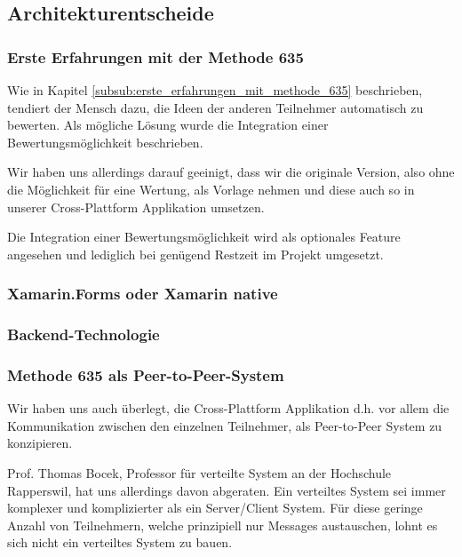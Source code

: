 \subsection{Architekturentscheide}

\subsubsection{Erste Erfahrungen mit der Methode 635}
Wie in Kapitel \ref{subsub:erste_erfahrungen_mit_methode_635} beschrieben, tendiert der Mensch dazu, die Ideen der anderen Teilnehmer automatisch zu bewerten. Als mögliche Lösung wurde die Integration einer Bewertungsmöglichkeit beschrieben.


Wir haben uns allerdings darauf geeinigt, dass wir die originale Version, also ohne die Möglichkeit für eine Wertung, als Vorlage nehmen und diese auch so in unserer Cross-Plattform Applikation umsetzen. 


Die Integration einer Bewertungsmöglichkeit wird als optionales Feature angesehen und lediglich bei genügend Restzeit im Projekt umgesetzt.

\subsubsection{Xamarin.Forms oder Xamarin native}

\subsubsection{Backend-Technologie}

\subsubsection{Methode 635 als Peer-to-Peer-System}
Wir haben uns auch überlegt, die Cross-Plattform Applikation d.h. vor allem die Kommunikation zwischen den einzelnen Teilnehmer, als Peer-to-Peer System \cite{Peer2Peer} zu konzipieren.


Prof. Thomas Bocek, Professor für verteilte System an der Hochschule Rapperswil, hat uns allerdings davon abgeraten. Ein verteiltes System sei immer komplexer und komplizierter als ein Server/Client System. Für diese geringe Anzahl von Teilnehmern, welche prinzipiell nur Messages austauschen, lohnt es sich nicht ein verteiltes System zu bauen. 


